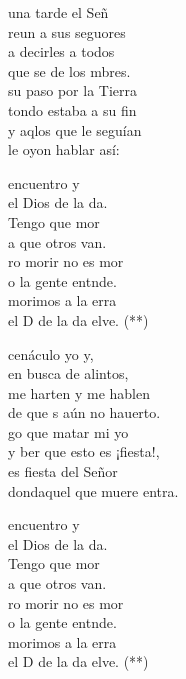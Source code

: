 \documentclass[12pt]{article}
\begin{document}
\begin{multicols*}{2}
\begin{cancion}%
	 una tarde el Señ \\
	reun a sus seguores\\
	a decirles a todos\\
	que se  de los mbres.\\
	 su paso por la Tierra\\
	tondo estaba a su fin\\
	y aqlos que le seguían\\
	le oyon hablar así:\\
	\begin{chorus}%
	 encuentro y\\
	 el Dios de la da.\\
	Tengo que mor\\
	a que otros van.\\
	ro morir no es mor\\
	o la gente entnde.\\
	morimos a la erra\\
	el D de la da elve. (**)\\
	\end{chorus}%
	 cenáculo yo y,\\
	 en busca de alintos,\\
	 me harten y me hablen\\
	de que s aún no hauerto.\\
	go que matar mi yo\\
	y ber que esto es ¡fiesta!,\\
	es fiesta del Señor\\
	dondaquel que muere entra.\\
	\begin{chorus}%
	 encuentro y\\
	 el Dios de la da.\\
	Tengo que mor\\
	a que otros van.\\
	ro morir no es mor\\
	o la gente entnde.\\
	morimos a la erra\\
	el D de la da elve. (**)\\
	\end{chorus}%
\end{cancion}%


\end{multicols*}
\end{document}
